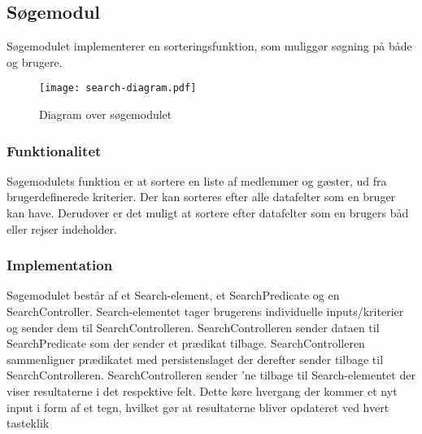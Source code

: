 \subsection{Søgemodul}
\label{sub:s_searchmodul}

Søgemodulet implementerer en sorteringsfunktion, som muliggør søgning på både og brugere.

\begin{figure}
  \centering
  \texttt{[image: search-diagram.pdf]}
  \caption{Diagram over søgemodulet}
\end{figure}
\subsubsection{Funktionalitet}
\label{sub:funktionalitet}

Søgemodulets funktion er at sortere en liste af medlemmer og gæster, ud fra brugerdefinerede kriterier. Der kan sorteres efter alle datafelter som en bruger kan have. Derudover er det muligt at sortere efter datafelter som en brugers båd eller rejser indeholder. 

\subsubsection{Implementation}
\label{sub:implementation}

Søgemodulet består af et Search-element, et SearchPredicate og en SearchController. Search-elementet tager brugerens individuelle inputs/kriterier og sender dem til SearchControlleren. SearchControlleren sender dataen til SearchPredicate som der sender et prædikat tilbage. SearchControlleren sammenligner prædikatet med persistenslaget der derefter sender  tilbage til SearchControlleren. SearchControlleren sender 'ne tilbage til Search-elementet der viser resultaterne i det respektive felt. Dette køre hvergang der kommer et nyt input i form af et tegn, hvilket gør at resultaterne bliver opdateret ved hvert tasteklik




